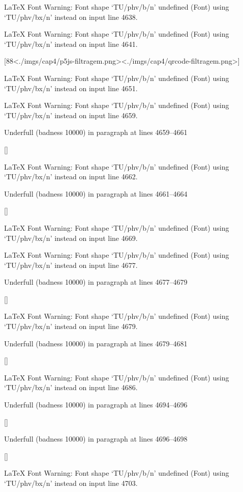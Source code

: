 LaTeX Font Warning: Font shape `TU/phv/b/n' undefined
(Font)              using `TU/phv/bx/n' instead on input line 4638.


LaTeX Font Warning: Font shape `TU/phv/b/n' undefined
(Font)              using `TU/phv/bx/n' instead on input line 4641.

[88<./imgs/cap4/p5js-filtragem.png><./imgs/cap4/qrcode-filtragem.png>]

LaTeX Font Warning: Font shape `TU/phv/b/n' undefined
(Font)              using `TU/phv/bx/n' instead on input line 4651.


LaTeX Font Warning: Font shape `TU/phv/b/n' undefined
(Font)              using `TU/phv/bx/n' instead on input line 4659.


Underfull \hbox (badness 10000) in paragraph at lines 4659--4661

 []


LaTeX Font Warning: Font shape `TU/phv/b/n' undefined
(Font)              using `TU/phv/bx/n' instead on input line 4662.


Underfull \hbox (badness 10000) in paragraph at lines 4661--4664

 []


LaTeX Font Warning: Font shape `TU/phv/b/n' undefined
(Font)              using `TU/phv/bx/n' instead on input line 4669.


LaTeX Font Warning: Font shape `TU/phv/b/n' undefined
(Font)              using `TU/phv/bx/n' instead on input line 4677.


Underfull \hbox (badness 10000) in paragraph at lines 4677--4679

 []


LaTeX Font Warning: Font shape `TU/phv/b/n' undefined
(Font)              using `TU/phv/bx/n' instead on input line 4679.


Underfull \hbox (badness 10000) in paragraph at lines 4679--4681

 []


LaTeX Font Warning: Font shape `TU/phv/b/n' undefined
(Font)              using `TU/phv/bx/n' instead on input line 4686.


Underfull \hbox (badness 10000) in paragraph at lines 4694--4696

 []


Underfull \hbox (badness 10000) in paragraph at lines 4696--4698

 []


LaTeX Font Warning: Font shape `TU/phv/b/n' undefined
(Font)              using `TU/phv/bx/n' instead on input line 4703.


